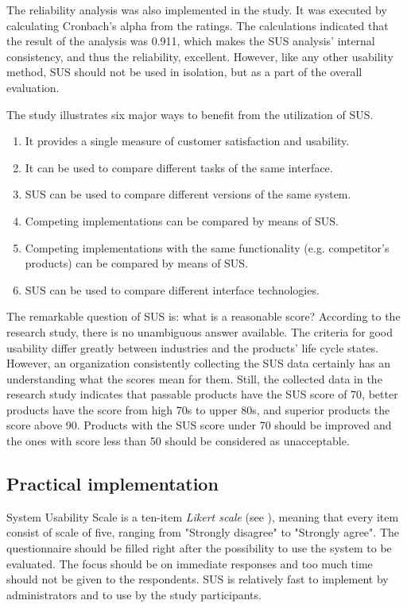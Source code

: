 \documentclass[12pt,a4paper,oneside,pdftex]{report}
\begin{document}
The reliability analysis was also implemented in the study. It was executed by calculating Cronbach's alpha from the ratings. The calculations indicated that the result of the analysis was 0.911, which makes the SUS analysis' internal consistency, and thus the reliability, excellent. However, like any other usability method, SUS should not be used in isolation, but as a part of the overall evaluation. \citep{RefWorks:12}

The study illustrates six major ways to benefit from the utilization of SUS. \citep{RefWorks:12}
\begin{enumerate}
\item It provides a single measure of customer satisfaction and usability.
\item It can be used to compare different tasks of the same interface. 
\item SUS can be used to compare different versions of the same system.
\item Competing implementations can be compared by means of SUS.
\item Competing implementations with the same functionality (e.g. competitor's products) can be compared by means of SUS.
\item SUS can be used to compare different interface technologies.
\end{enumerate}

The remarkable question of SUS is: what is a reasonable score? According to the research study, there is no unambiguous answer available. The criteria for good usability differ greatly between industries and the products' life cycle states. However, an organization consistently collecting the SUS data certainly has an understanding what the scores mean for them. Still, the collected data in the research study indicates that passable products have the SUS score of 70, better products have the score from high 70s to upper 80s, and superior products the score above 90. Products with the SUS score under 70 should be improved and the ones with score less than 50 should be considered as unacceptable. \citep{RefWorks:12}

\subsection{Practical implementation}
System Usability Scale is a ten-item \emph{Likert scale} (see ), meaning that every item consist of scale of five, ranging from "Strongly disagree" to "Strongly agree". The questionnaire should be filled right after the possibility to use the system to be evaluated. The focus should be on immediate responses and too much time should not be given to the respondents. SUS is relatively fast to implement by administrators and to use by the study participants. \citep{RefWorks:10} 
\end{document}
